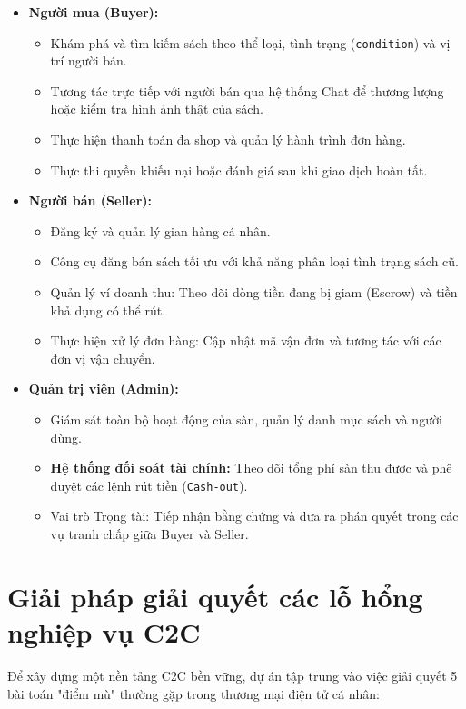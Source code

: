 \documentclass[../main.tex]{subfiles}
\begin{document}
\begin{itemize}
    \item \textbf{Người mua (Buyer):}
    \begin{itemize}
        \item Khám phá và tìm kiếm sách theo thể loại, tình trạng (\texttt{condition}) và vị trí người bán.
        \item Tương tác trực tiếp với người bán qua hệ thống Chat để thương lượng hoặc kiểm tra hình ảnh thật của sách.
        \item Thực hiện thanh toán đa shop và quản lý hành trình đơn hàng.
        \item Thực thi quyền khiếu nại hoặc đánh giá sau khi giao dịch hoàn tất.
    \end{itemize}
    \item \textbf{Người bán (Seller):}
    \begin{itemize}
        \item Đăng ký và quản lý gian hàng cá nhân.
        \item Công cụ đăng bán sách tối ưu với khả năng phân loại tình trạng sách cũ.
        \item Quản lý ví doanh thu: Theo dõi dòng tiền đang bị giam (Escrow) và tiền khả dụng có thể rút.
        \item Thực hiện xử lý đơn hàng: Cập nhật mã vận đơn và tương tác với các đơn vị vận chuyển.
    \end{itemize}
    \item \textbf{Quản trị viên (Admin):}
    \begin{itemize}
        \item Giám sát toàn bộ hoạt động của sàn, quản lý danh mục sách và người dùng.
        \item \textbf{Hệ thống đối soát tài chính:} Theo dõi tổng phí sàn thu được và phê duyệt các lệnh rút tiền (\texttt{Cash-out}).
        \item Vai trò Trọng tài: Tiếp nhận bằng chứng và đưa ra phán quyết trong các vụ tranh chấp giữa Buyer và Seller.
    \end{itemize}
\end{itemize}

\section{Giải pháp giải quyết các lỗ hổng nghiệp vụ C2C}
Để xây dựng một nền tảng C2C bền vững, dự án tập trung vào việc giải quyết 5 bài toán "điểm mù" thường gặp trong thương mại điện tử cá nhân:
\end{document}
